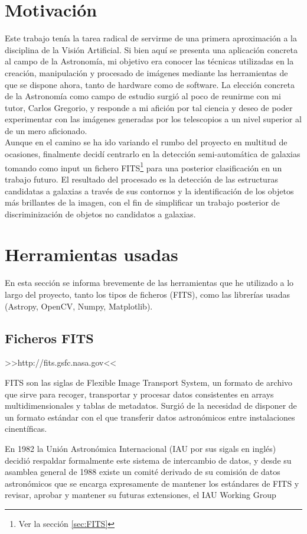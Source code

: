 \documentclass[a4paper,12pt]{article}
\begin{document}
\section{Motivación}
Este trabajo tenía la tarea radical de servirme de una primera aproximación a la disciplina de la Visión Artificial. Si bien aquí se presenta una aplicación concreta al campo de la Astronomía, mi objetivo era conocer las técnicas utilizadas en la creación, manipulación y procesado de imágenes mediante las herramientas de que se dispone ahora, tanto de hardware como de software. La elección concreta de la Astronomía como campo de estudio surgió al poco de reunirme con mi tutor, Carlos Gregorio, y responde a mi afición por tal ciencia y deseo de poder experimentar con las imágenes generadas por los telescopios a un nivel superior al de un mero aficionado.
\\
Aunque en el camino se ha ido variando el rumbo del proyecto en multitud de ocasiones, finalmente decidí centrarlo en la detección semi-automática de galaxias tomando como input un fichero FITS\footnote{Ver la sección \ref{sec:FITS}} para una posterior clasificación en un trabajo futuro. El resultado del procesado es la detección de las estructuras candidatas a galaxias a través de sus contornos y la identificación de los objetos más brillantes de la imagen, con el fin de simplificar un trabajo posterior de discriminización de objetos no candidatos a galaxias.


\section{Herramientas usadas}

En esta sección se informa brevemente de las herramientas que he utilizado a lo largo del proyecto, tanto los tipos de ficheros (FITS), como las librerías usadas (Astropy, OpenCV, Numpy, Matplotlib).
\subsection{Ficheros FITS} >>http://fits.gsfc.nasa.gov<<
\label{sec:FITS}

FITS son las siglas de Flexible Image Transport System, un formato de archivo que sirve para recoger, transportar y procesar datos consistentes en arrays multidimensionales y tablas de metadatos. Surgió de la necesidad de disponer de un formato estándar con el que transferir datos astronómicos entre instalaciones cinentíficas.

En 1982 la Unión Astronómica Internacional (IAU por sus sigals en inglés) decidió respaldar formalmente este sistema de intercambio de datos, y desde su asamblea general de 1988 existe un comité derivado de su comisión de datos astronómicos que se encarga expresamente de mantener los estándares de FITS y revisar, aprobar y mantener su futuras extensiones, el IAU Working Group 
\end{document}
